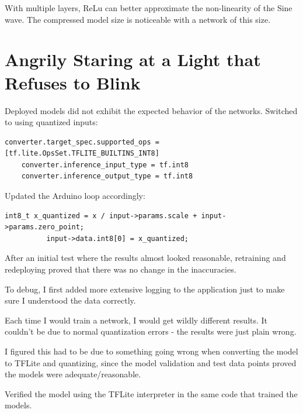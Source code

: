 \documentclass{article}
\begin{document}
    With multiple layers, ReLu can better approximate the non-linearity of the Sine wave.
    The compressed model size is noticeable with a network of this size.

    \section{Angrily Staring at a Light that Refuses to Blink }\label{sec:arduino}

    Deployed models did not exhibit the expected behavior of the networks.
    Switched to using quantized inputs:

    \begin{lstlisting}[label={lst:qin}]
    converter.target_spec.supported_ops = [tf.lite.OpsSet.TFLITE_BUILTINS_INT8]
    converter.inference_input_type = tf.int8
    converter.inference_output_type = tf.int8
    \end{lstlisting}

    Updated the Arduino loop accordingly:

    \begin{lstlisting}[label={lst:aloop}]
          int8_t x_quantized = x / input->params.scale + input->params.zero_point;
          input->data.int8[0] = x_quantized;
    \end{lstlisting}

    After an initial test where the results almost looked reasonable, retraining and redeploying proved that there was no change in the inaccuracies.

    To debug, I first added more extensive logging to the application just to make sure I understood the data correctly.

    Each time I would train a network, I would get wildly different results.
    It couldn't be due to normal quantization errors - the results were just plain wrong.

    I figured this had to be due to something going wrong when converting the model to TFLite and quantizing, since the model validation and test data points proved the models were adequate/reasonable.

    Verified the model using the TFLite interpreter in the same code that trained the models.
\end{document}
